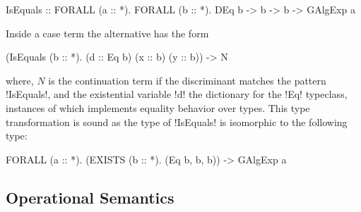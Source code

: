 \documentclass[screen,nonacm,manuscript,review]{acmart} %
\begin{document}
\begin{CenteredBox}
\begin{code}
IsEquals :: FORALL (a :: *). FORALL (b :: *). DEq b -> b -> b -> GAlgExp a
\end{code}
\end{CenteredBox}

Inside a case term the alternative has the form

\begin{CenteredBox}
\begin{code}
(IsEquals (b :: *). (d :: Eq b) (x :: b) (y :: b)) -> N
\end{code}
\end{CenteredBox}

where, $N$ is the continuation term if the discriminant matches the pattern
!IsEquals!, and the existential variable !d! the dictionary for the !Eq!
typeclass, instances of which implements equality behavior over types.
This type transformation is sound as the type of !IsEquals! is
isomorphic to the following type:

\begin{CenteredBox}
\begin{code}
FORALL (a :: *). (EXISTS (b :: *). (Eq b, b, b)) -> GAlgExp a
\end{code}
\end{CenteredBox}

\subsection{Operational Semantics}\label{sec:sfc-op-sem}
\newcommand{\Beta}{
 \ib{\irule[\trule{$\beta$}]
 {};
 {$\stepsto {(\Lam {x\co\tau} M) \App N} {\Set{x\mapsto N}M}$}
 }
}
\newcommand{\TBeta}{
 \ib{\irule[\trule{Ty-$\beta$}]
 {};
 {$\stepsto {(\TLam \TyVar M) \App \tau} {\Set{\TyVar\mapsto \tau}M}$}
 }
}
\newcommand{\CaseE}{
 \ib{\irule[\trule{case}]
 {};
 {\stepsto {\Case {(K \many\sigma\many\phi\many\Tm)} {\Set{...; K\App\many\beta\App\many x \to N; ...}}} {\Set{\many {\beta\mapsto\phi}, \many{x\mapsto\Tm}}N}}
 }
}
\newcommand{\CoTransE}{
 \ib{\irule[\trule{Co-Trans}]
 {};
 {$\stepsto {\Cast {(\Cast \Val \Co)} {\nu}} {\Cast \Val {(\Trans{\Co} {\nu})}}$}
 }
}

\newcommand{\TyPush}{
 \ib{\irule[\trule{ty-push}];
 {$\stepsto {(\Cast{\TLam {\TyVar\co\kappa} M}\Co)\App \tau} {({\TLam {\TyVar\co\kappa} (\Cast M {\Co\At\TyVar})})\App \tau}$}
 }
}
\end{document}

